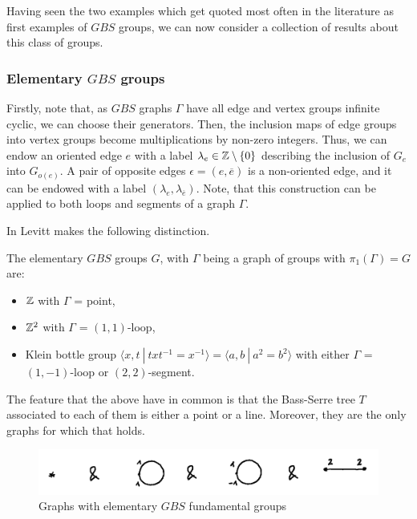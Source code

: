 Having seen the two examples which get quoted most often in the literature as first examples of $GBS$ groups, we can now consider a collection of results about this class of groups.

\subsubsection{Elementary $GBS$ groups} \label{labelledGBSgraph}
Firstly, note that, as $GBS$ graphs $\Gamma$ have all edge and vertex groups infinite cyclic, we can choose their generators. Then, the inclusion maps of edge groups into vertex groups become multiplications by non-zero integers. Thus, we can endow an oriented edge $e$ with a label $\lambda_e \in \mathbb{Z} \setminus \{0\}$ describing the inclusion of $G_e$ into $G_{o(e)}$. A pair of opposite edges $\epsilon = (e,\overline{e})$ is a non-oriented edge, and it can be endowed with a label $(\lambda_e,\lambda_{\overline{e}})$. Note, that this construction can be applied to both loops and segments of a graph $\Gamma$.

In \cite{Le07} Levitt makes the following distinction.

\begin{remark} \label{elemlinegbs}
    The elementary $GBS$ groups $G$, with $\Gamma$ being a graph of groups with $\pi_1(\Gamma) = G$ are:
    \begin{itemize}
        \item $\mathbb{Z}$ with $\Gamma$ = point,
        \item $\mathbb{Z}^2$ with $\Gamma$ = $(1,1)$-loop,
        \item Klein bottle group $\langle x,t \: | \: txt^{-1} = x^{-1} \rangle = \langle a,b \: | \: a^2 = b^2\rangle$ with either $\Gamma$ = $(1,-1)$-loop or $(2,2)$-segment.
    \end{itemize}
    The feature that the above have in common is that the Bass-Serre tree $T$ associated to each of them is either a point or a line. Moreover, they are the only graphs for which that holds.
\end{remark}

\begin{figure}[h]
    \centering
    \includegraphics[scale = 0.15]{sections/alicja/Elementary graphs.jpeg}
    \caption{Graphs with elementary $GBS$ fundamental groups}
    \label{elementarygraphs}
\end{figure}

